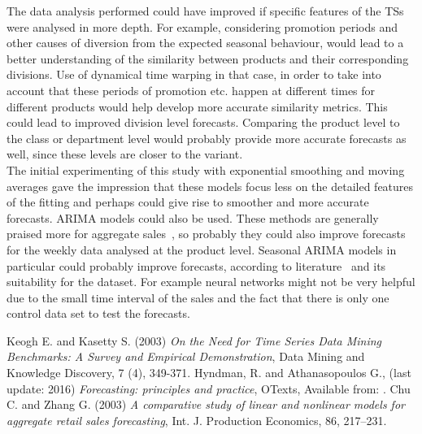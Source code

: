 \documentclass[11pt]{article}
\begin{document}
The data analysis performed could have improved if specific features of the TSs were analysed in more depth. For example, considering promotion periods and other causes of diversion from the expected seasonal behaviour, would lead to a better understanding of the similarity between products and their corresponding divisions. Use of dynamical time warping in that case, in order to take into account that these periods of promotion etc. happen at different times for different products would help develop more accurate similarity metrics. This could lead to improved division level forecasts. Comparing the product level to the class or department level would probably provide more accurate forecasts as well, since these levels are closer to the variant.\\

The initial experimenting of this study with exponential smoothing and moving averages gave the impression that these models focus less on the detailed features of the fitting and perhaps could give rise to smoother and more accurate forecasts. ARIMA models could also be used. These methods are generally praised more for aggregate sales~\cite{fin}, so probably they could also improve forecasts for the weekly data analysed at the product level. Seasonal ARIMA models in particular could probably improve forecasts, according to literature~\cite{fin} and its suitability for the dataset. For example neural networks might not be very helpful due to the small time interval of the sales and the fact that there is only one control data set to test the forecasts.


\begin{thebibliography}{1}
 Keogh E. and Kasetty S. (2003) \textit{On the Need for Time Series Data Mining Benchmarks: A Survey and Empirical Demonstration}, Data Mining and Knowledge Discovery, 7 (4), 349-371.
 Hyndman, R. and Athanasopoulos G., (last update: 2016) \textit{Forecasting: principles and practice}, OTexts, Available from: .
 Chu C. and Zhang G. (2003) \textit{A comparative study of linear and nonlinear models for aggregate retail sales forecasting}, Int. J. Production Economics, 86, 217–231.
\end{thebibliography}
\end{document}
